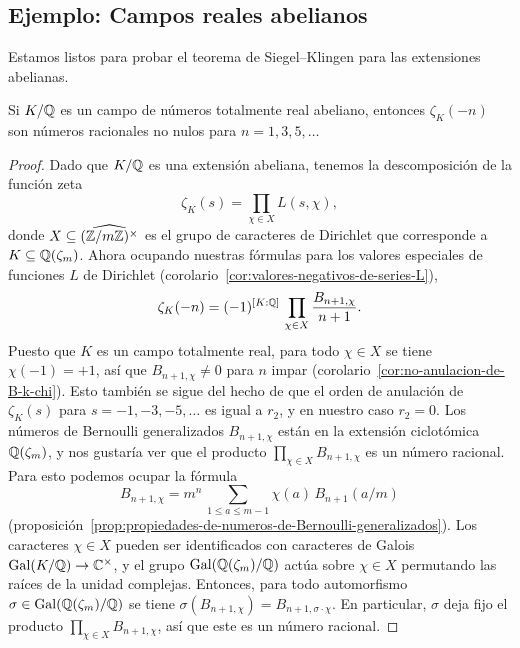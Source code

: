 \subsection{Ejemplo: Campos reales abelianos}

Estamos listos para probar el teorema de Siegel--Klingen para las extensiones
abelianas.

\begin{teorema}
  Si $K/\mathbb{Q}$ es un campo de números totalmente real abeliano, entonces
  $\zeta_K (-n)$ son números racionales no nulos para $n = 1,3,5,\ldots$

  \begin{proof}
    Dado que $K/\mathbb{Q}$ es una extensión abeliana, tenemos la descomposición de la
    función zeta
    $$\zeta_K (s) = \prod_{\chi\in X} L (s,\chi),$$
    donde $X \subseteq \widehat{(\mathbb{Z}/m\mathbb{Z})^\times}$ es el grupo de caracteres de
    Dirichlet que corresponde a $K \subseteq \mathbb{Q} (\zeta_m)$. Ahora ocupando
    nuestras fórmulas para los valores especiales de funciones $L$ de Dirichlet
    (corolario~\ref{cor:valores-negativos-de-series-L}),
    $$\zeta_K (-n) = (-1)^{[K:\mathbb{Q}]}\,\prod_{\chi\in X} \frac{B_{n+1,\chi}}{n+1}.$$
    Puesto que $K$ es un campo totalmente real, para todo $\chi \in X$ se tiene
    $\chi (-1) = +1$, así que $B_{n+1,\chi} \ne 0$ para $n$ impar
    (corolario~\ref{cor:no-anulacion-de-B-k-chi}). Esto también se sigue del
    hecho de que el orden de anulación de $\zeta_K (s)$ para
    $s = -1, -3, -5, \ldots$ es igual a $r_2$, y en nuestro caso $r_2 = 0$.
    Los números de Bernoulli generalizados $B_{n+1,\chi}$ están en la extensión
    ciclotómica $\mathbb{Q} (\zeta_m)$, y nos gustaría ver que el producto
    $\prod_{\chi\in X} B_{n+1,\chi}$ es un número racional. Para esto podemos
    ocupar la fórmula
    $$B_{n+1,\chi} = m^n\,\sum_{1 \le a \le m-1} \chi (a)\,B_{n+1} (a/m)$$
    (proposición~\ref{prop:propiedades-de-numeros-de-Bernoulli-generalizados}).
    Los caracteres $\chi\in X$ pueden ser identificados con caracteres de Galois
    $\operatorname{Gal} (K/\mathbb{Q}) \to \mathbb{C}^\times$, y el grupo $\operatorname{Gal} (\mathbb{Q} (\zeta_m)/\mathbb{Q})$ actúa
    sobre $\chi\in X$ permutando las raíces de la unidad complejas. Entonces,
    para todo automorfismo $\sigma \in \operatorname{Gal} (\mathbb{Q} (\zeta_m)/\mathbb{Q})$ se tiene
    $\sigma (B_{n+1,\chi}) = B_{n+1,\sigma\cdot\chi}$. En particular, $\sigma$
    deja fijo el producto $\prod_{\chi\in X} B_{n+1,\chi}$, así que este es un
    número racional.
  \end{proof}
\end{teorema}

